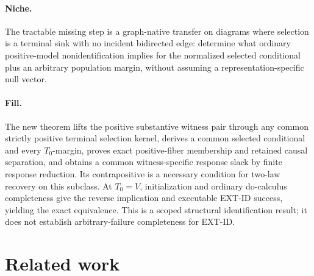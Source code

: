 \documentclass{article}
\begin{document}
\paragraph{Niche.} The tractable missing step is a graph-native transfer on diagrams where selection is a terminal sink with no incident bidirected edge: determine what ordinary positive-model nonidentification implies for the normalized selected conditional plus an arbitrary population margin, without assuming a representation-specific null vector.

\paragraph{Fill.} The new theorem lifts the positive substantive witness pair through any common strictly positive terminal selection kernel, derives a common selected conditional and every \(T_0\)-margin, proves exact positive-fiber membership and retained causal separation, and obtains a common witness-specific response slack by finite response reduction. Its contrapositive is a necessary condition for two-law recovery on this subclass. At \(T_0=V\), initialization and ordinary do-calculus completeness give the reverse implication and executable EXT-ID success, yielding the exact equivalence. This is a scoped structural identification result; it does not establish arbitrary-failure completeness for EXT-ID.

\section{Related work}
\end{document}
